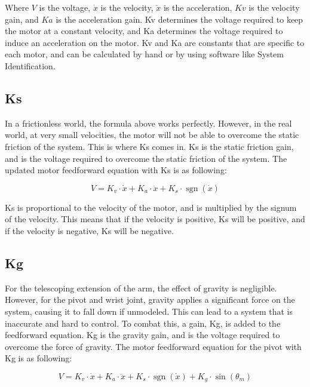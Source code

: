 \documentclass{scrartcl}
\DeclareMathOperator{\sgn}{sgn}
\begin{document}
Where \(V\) is the voltage, \(\dot{x}\) is the velocity, \(\ddot{x}\) is the acceleration, \(Kv\) is the velocity gain, and \(Ka\) is the acceleration gain. Kv determines the voltage required to keep the motor at a constant velocity, and Ka determines the voltage required to induce an acceleration on the motor. Kv and Ka are constants that are specific to each motor, and can be calculated by hand or by using software like System Identification.

\subsection{Ks}
In a frictionless world, the formula above works perfectly. However, in the real world, at very small velocities, the motor will not be able to overcome the static friction of the system. This is where Ks comes in. Ks is the static friction gain, and is the voltage required to overcome the static friction of the system. The updated motor feedforward equation with Ks is as following:

\begin{equation} \label{Motor Feedforward Equation with Static Friction}
    V = K_v \cdot \dot{x} + K_a \cdot \ddot{x} + K_s \cdot \sgn(\dot{x})
\end{equation}

Ks is proportional to the velocity of the motor, and is multiplied by the signum of the velocity. This means that if the velocity is positive, Ks will be positive, and if the velocity is negative, Ks will be negative.

\subsection{Kg}
For the telescoping extension of the arm, the effect of gravity is negligible. However, for the pivot and wrist joint, gravity applies a significant force on the system, causing it to fall down if unmodeled. This can lead to a system that is inaccurate and hard to control. To combat this, a gain, Kg, is added to the feedforward equation. Kg is the gravity gain, and is the voltage required to overcome the force of gravity. The motor feedforward equation for the pivot with Kg is as following:

\begin{equation} \label{Motor Feedforward Equation with Gravity Pivot}
    V = K_v \cdot \dot{x} + K_a \cdot \ddot{x} + K_s \cdot  \sgn(\dot{x}) + K_g \cdot \sin(\theta_{m})
\end{equation}
\end{document}
